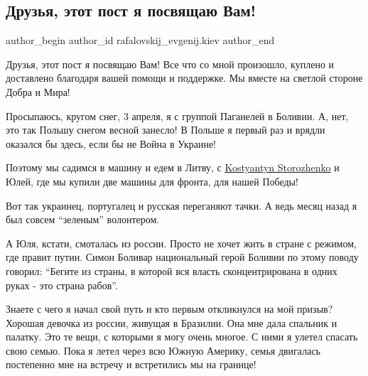  
 
 
 
 
 
\subsection{Друзья, этот пост я посвящаю Вам!}
\label{sec:04_04_2022.fb.rafalovskij_evgenij.kiev.1.druzja_post}
 
\ifcmt
 author_begin
   author_id rafalovskij_evgenij.kiev
 author_end
\fi

Друзья, этот пост я посвящаю Вам! Все  что со мной произошло, куплено и
доставлено благодаря вашей помощи и поддержке. Мы вместе на светлой стороне
Добра и Мира! 

Просыпаюсь, кругом снег, 3 апреля, я с группой Паганелей в Боливии. А, нет, это
так  Польшу снегом весной занесло!   В Польше я первый раз и врядли оказался бы
здесь, если бы не Война в Украине! 

Поэтому мы садимся в машину и едем в Литву,  с
\href{https://www.facebook.com/kostyantyn.storozhenko}{Kostyantyn Storozhenko}
и Юлей, где мы купили две машины для фронта, для нашей Победы!

Вот так украинец, португалец и русская  переганяют тачки. А ведь месяц назад я
был совсем \enquote{зеленым} волонтером. 


А Юля, кстати, смоталась из россии. Просто не хочет жить в стране с режимом,
где правит путин. Симон Боливар национальный герой Боливии по этому поводу
говорил: \enquote{Бегите из страны, в которой вся власть сконцентрирована в
одних руках - это страна рабов}. 

Знаете с чего я начал свой путь и кто первым откликнулся на мой призыв?
Хорошая девочка  из россии, живущая в Бразилии. Она мне дала спальник и
палатку. Это те вещи, с которыми я могу очень многое. С ними я улетел спасать
свою семью. Пока я летел через всю Южную Америку, семья двигалась  постепенно
мне на встречу и встретились мы на границе! 

